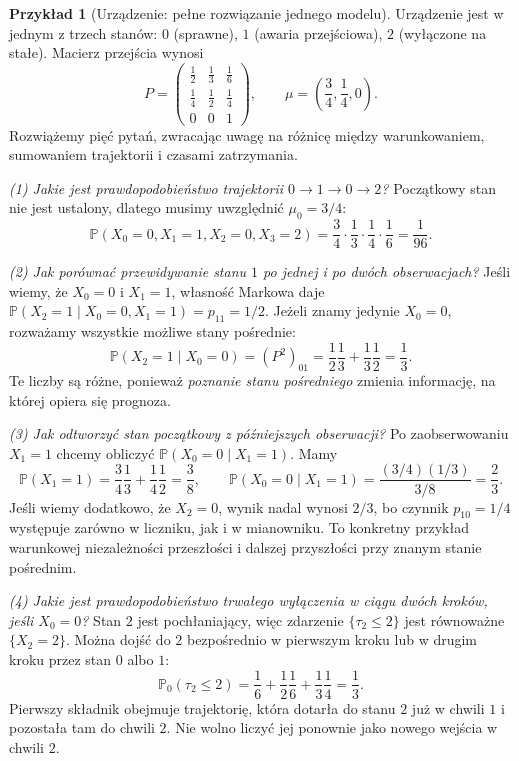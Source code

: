 \documentclass[11pt,a4paper,oneside]{report}
\numberwithin{equation}{chapter}
\theoremstyle{plain}
\theoremstyle{definition}
\newtheorem{przyklad}{Przykład}[chapter]
\theoremstyle{remark}
\newcommand{\Prob}{\mathbb{P}}
\begin{document}
\begin{przyklad}[Urządzenie: pełne rozwiązanie jednego modelu]
Urządzenie jest w jednym z trzech stanów:
$0$ (sprawne), $1$ (awaria przejściowa),
$2$ (wyłączone na stałe). Macierz przejścia wynosi
\[
P=\begin{pmatrix}
\frac12&\frac13&\frac16\\
\frac14&\frac12&\frac14\\
0&0&1
\end{pmatrix},
\qquad
\mu=\left(\frac34,\frac14,0\right).
\]
Rozwiążemy pięć pytań, zwracając uwagę na różnicę
między warunkowaniem, sumowaniem trajektorii
i czasami zatrzymania.

\emph{(1) Jakie jest prawdopodobieństwo trajektorii
$0\to1\to0\to2$?}
Początkowy stan nie jest ustalony, dlatego
musimy uwzględnić $\mu_0=3/4$:
\[
\Prob(X_0=0,X_1=1,X_2=0,X_3=2)
=\frac34\cdot\frac13\cdot\frac14\cdot\frac16
=\frac1{96}.
\]

\emph{(2) Jak porównać przewidywanie stanu $1$
po jednej i po dwóch obserwacjach?}
Jeśli wiemy, że $X_0=0$ i $X_1=1$, własność
Markowa daje
$\Prob(X_2=1\mid X_0=0,X_1=1)=p_{11}=1/2$.
Jeżeli znamy jedynie $X_0=0$, rozważamy wszystkie
możliwe stany pośrednie:
\[
\Prob(X_2=1\mid X_0=0)
=(P^2)_{01}=\frac12\frac13+\frac13\frac12=\frac13.
\]
Te liczby są różne, ponieważ \emph{poznanie stanu
pośredniego} zmienia informację, na której opiera się prognoza.

\emph{(3) Jak odtworzyć stan początkowy z późniejszych obserwacji?}
Po zaobserwowaniu $X_1=1$ chcemy obliczyć
$\Prob(X_0=0\mid X_1=1)$. Mamy
\[
\Prob(X_1=1)=\frac34\frac13+\frac14\frac12=\frac38,
\qquad
\Prob(X_0=0\mid X_1=1)
=\frac{(3/4)(1/3)}{3/8}=\frac23.
\]
Jeśli wiemy dodatkowo, że $X_2=0$, wynik nadal
wynosi $2/3$, bo czynnik $p_{10}=1/4$ występuje
zarówno w liczniku, jak i w mianowniku. To konkretny
przykład warunkowej niezależności przeszłości
i dalszej przyszłości przy znanym stanie pośrednim.

\emph{(4) Jakie jest prawdopodobieństwo trwałego
wyłączenia w ciągu dwóch kroków, jeśli $X_0=0$?}
Stan $2$ jest pochłaniający, więc zdarzenie
$\{\tau_2\leq2\}$ jest równoważne $\{X_2=2\}$.
Można dojść do $2$ bezpośrednio w pierwszym kroku
lub w drugim kroku przez stan $0$ albo $1$:
\[
\Prob_0(\tau_2\leq2)
=\frac16+\frac12\frac16+\frac13\frac14
=\frac13.
\]
Pierwszy składnik obejmuje trajektorię, która
dotarła do stanu $2$ już w chwili $1$ i pozostała tam
do chwili $2$. Nie wolno liczyć jej ponownie jako
nowego wejścia w chwili $2$.


\end{przyklad}
\end{document}
